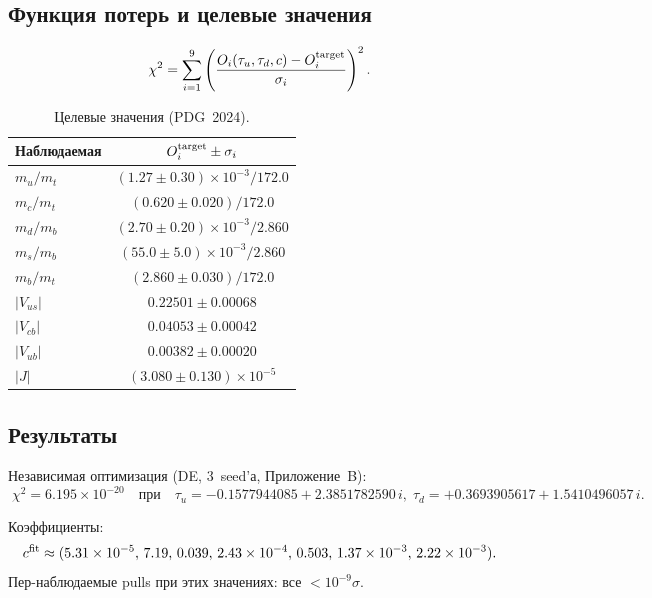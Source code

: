 \documentclass[12pt,a4paper]{article}
\numberwithin{equation}{section}
\begin{document}
\subsection{Функция потерь и целевые значения}
\label{sec:targets}

\begin{equation}
\chi^2 = \sum_{i=1}^{9} \left(\frac{O_i(\tau_u,\tau_d,c) - O_i^{\rm target}}{\sigma_i}\right)^2.
\label{eq:chi2}
\end{equation}

\begin{table}[H]
\centering
\caption{Целевые значения (PDG~2024).}
\label{tab:targets}
\begin{tabular}{lc}
\toprule
Наблюдаемая & $O_i^{\rm target} \pm \sigma_i$ \\
\midrule
$m_u/m_t$ & $(1.27 \pm 0.30)\times10^{-3}/172.0$ \\
$m_c/m_t$ & $(0.620 \pm 0.020)/172.0$ \\
$m_d/m_b$ & $(2.70 \pm 0.20)\times10^{-3}/2.860$ \\
$m_s/m_b$ & $(55.0 \pm 5.0)\times10^{-3}/2.860$ \\
$m_b/m_t$ & $(2.860 \pm 0.030)/172.0$ \\
$|V_{us}|$ & $0.22501 \pm 0.00068$ \\
$|V_{cb}|$ & $0.04053 \pm 0.00042$ \\
$|V_{ub}|$ & $0.00382 \pm 0.00020$ \\
$|J|$ & $(3.080 \pm 0.130)\times10^{-5}$ \\
\bottomrule
\end{tabular}
\end{table}

\subsection{Результаты}
\label{sec:fermion-results}

Независимая оптимизация (DE, 3~seed'а, Приложение~B):
\begin{equation}
\boxed{\;\chi^2 = 6.195\times10^{-20}
\quad\text{при}\quad
\tau_u = -0.1577944085 + 2.3851782590\,i,\;
\tau_d = +0.3693905617 + 1.5410496057\,i.\;}
\end{equation}

Коэффициенты:
\begin{equation}
c^{\rm fit} \approx (5.31\times10^{-5},\,7.19,\,0.039,\,
2.43\times10^{-4},\,0.503,\,1.37\times10^{-3},\,2.22\times10^{-3}).
\label{eq:coefs-fit}
\end{equation}
Пер-наблюдаемые pulls при этих значениях: все $< 10^{-9}\sigma$.
\end{document}
